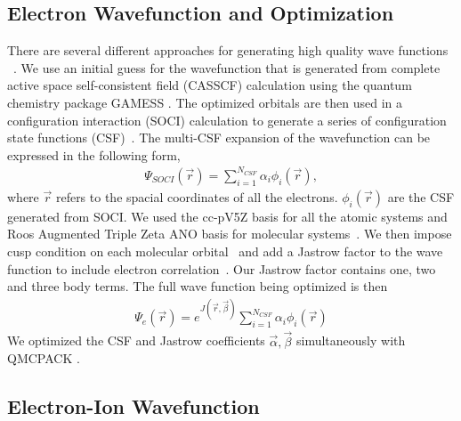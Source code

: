 \documentclass[pra,superscriptaddress,groupedaddress,twocolumn]{revtex4}
\begin{document}
\subsection{Electron Wavefunction and Optimization}
There are several different approaches for generating high quality wave functions ~\cite{Umrigar_Alleviation,Toulouse_Bench, Brown_Bench,Seth_Bench}. We use an initial guess for the wavefunction that is generated from complete active space self-consistent field (CASSCF) \cite{Chaban_MCSCF,Szabo} calculation using the quantum chemistry package GAMESS \cite{GAMESS}. The optimized orbitals are then used in a configuration interaction (SOCI) calculation to generate a series of configuration state functions (CSF)~\cite{Clark_Bench}. The multi-CSF expansion of the wavefunction  can be expressed in the following form,
\begin{align}
\Psi_{SOCI}(\vec{r})=\sum\limits_{i=1}^{N_{CSF}}\alpha_i\phi_i(\vec{r}), \label{eq:psi_gms}
\end{align}
where $\vec{r}$ refers to the spacial coordinates of all the electrons. $\phi_i(\vec{r})$ are the CSF generated from SOCI. We used the cc-pV5Z basis for all the atomic systems and Roos Augmented Triple Zeta ANO basis for molecular systems~\cite{dunning,roos}. We then impose cusp condition on each molecular orbital~\cite{cusp} and add a Jastrow factor to the wave function to include electron correlation~\cite{Kato}. Our Jastrow factor contains one, two and three body terms. The full wave function being optimized is then
\begin{align}
\Psi_e(\vec{r})=e^{J(\vec{r},\vec{\beta})}\sum\limits_{i=1}^{N_{CSF}}\alpha_i\phi_i(\vec{r})\label{eq:psie}
\end{align}
We optimized the CSF and Jastrow coefficients $\vec{\alpha},\vec{\beta}$ simultaneously with QMCPACK \cite{QMCPACK}.

\subsection{Electron-Ion Wavefunction}
\end{document}
